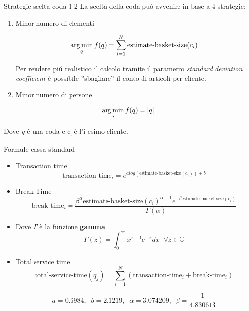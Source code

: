 \begin{frame}{Strategie scelta coda 1-2}
  La scelta della coda puó avvenire in base a 4 strategie:
  \begin{enumerate}
  \item Minor numero di elementi

    \begin{equation}
      \operatorname*{arg\,min}_q f(q) = \sum\limits_{i=1}^N \text{estimate-basket-size}(c_i) 
    \end{equation}

    Per rendere piú realistico il calcolo tramite il parametro
    \textit{standard deviation coefficient} é possibile ''sbagliare''
    il conto di articoli per cliente.
    
  \item Minor numero di persone
   \end{enumerate}
   
   \begin{equation}
     \operatorname*{arg\,min}_q f(q) = |q|
   \end{equation}

   Dove \textit{q} é una coda e c\textsubscript{i} é l'i-esimo
   cliente.   
 \end{frame}



\begin{frame}{Formule cassa standard}
  \begin{itemize}
  \item Transaction time
    \begin{equation}
      \text{transaction-time}_i = e^{a log(\text{estimate-basket-size}(c_i)) + b}
    \end{equation}
\item Break Time
  \begin{equation}
    \text{break-time}_i = \frac{\beta^{\alpha} \text{estimate-basket-size}(c_i)^{\alpha - 1} e^{- \beta \text{estimate-basket-size}(c_i)}}{\Gamma (\alpha)}
  \end{equation}  

\item Dove $\Gamma$ è la funzione \textbf{gamma}
  \begin{equation}
    \Gamma (z) = \int_{0}^{\infty} x^{z-1} e^{-x} dx \;\; \forall z \in \mathbb{C}
  \end{equation}

\item Total service time
  \begin{equation}
    \text{total-service-time}(q_j) = \sum\limits_{i=1}^N \left( \text{transaction-time}_i + \text{break-time}_i \right)
  \end{equation}

  \begin{equation}
    a = 0.6984, \;\; b = 2.1219, \;\; \alpha = 3.074209, \;\; \beta = \frac{1}{4.830613}
  \end{equation}
  
\end{itemize}  
\end{frame}


